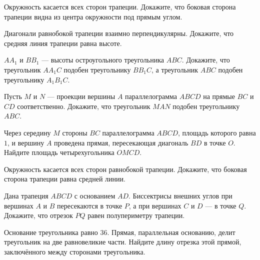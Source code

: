 \begin{class}[number=6]
	\begin{listofex}
		\item Окружность касается всех сторон трапеции. Докажите, что боковая сторона трапеции видна из центра окружности под прямым углом.
		\item Диагонали равнобокой трапеции взаимно перпендикулярны. Докажите, что средняя линия трапеции равна высоте.
		\item \( AA_1 \) и \( BB_1 \) --- высоты остроугольного треугольника \( ABC \). Докажите, что треугольник \( AA_1C \) подобен треугольнику \( BB_1C \), а треугольник \( ABC \) подобен треугольнику \( A_1B_1C \).
		\item Пусть \( M \) и \( N \) --- проекции вершины \( A \) параллелограмма \( ABCD \) на прямые \( BC \) и \( CD \) соответственно. Докажите, что треугольник \( MAN \) подобен треугольнику \( ABC \).
		\item Через середину \( M \) стороны \( BC \) параллелограмма \( ABCD \), площадь которого равна \( 1 \), и вершину \( A \) проведена прямая, пересекающая диагональ \( BD \) в точке \( O \). Найдите площадь четырехугольника \( OMCD \).
	\end{listofex}
\end{class}

\begin{homework}[number=3]
	\begin{listofex}
		\item Окружность касается всех сторон равнобокой трапеции. Докажите, что боковая сторона трапеции равна средней линии.
		\item Дана трапеция \( ABCD \) с основанием \( AD \). Биссектрисы внешних углов при вершинах \( A \) и \( B \) пересекаются в точке \( P \), а при вершинах \( C \) и \( D \) --- в точке \( Q \). Докажите, что отрезок \( PQ \) равен полупериметру трапеции.
		\item Основание треугольника равно \( 36 \). Прямая, параллельная основанию, делит треугольник на две равновеликие части. Найдите длину отрезка этой прямой, заключённого между сторонами треугольника.
	\end{listofex}
\end{homework}

